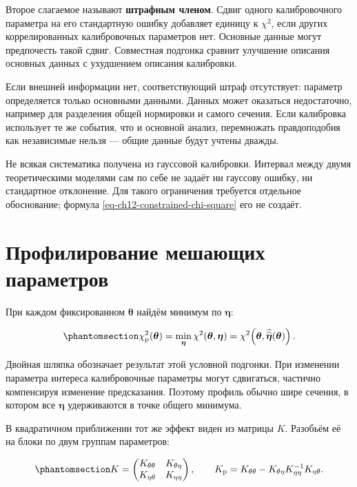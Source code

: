 \documentclass[
  russian,
  11pt,
  a4paper,
  open=any]{scrbook}
\begin{document}
Второе слагаемое называют \textbf{штрафным членом}. Сдвиг одного
калибровочного параметра на его стандартную ошибку добавляет единицу к
\(\chi^2\), если других коррелированных калибровочных параметров нет.
Основные данные могут предпочесть такой сдвиг. Совместная подгонка
сравнит улучшение описания основных данных с ухудшением описания
калибровки.

Если внешней информации нет, соответствующий штраф отсутствует: параметр
определяется только основными данными. Данных может оказаться
недостаточно, например для разделения общей нормировки и самого сечения.
Если калибровка использует те же события, что и основной анализ,
перемножать правдоподобия как независимые нельзя --- общие данные будут
учтены дважды.

Не всякая систематика получена из гауссовой калибровки. Интервал между
двумя теоретическими моделями сам по себе не задаёт ни гауссову ошибку,
ни стандартное отклонение. Для такого ограничения требуется отдельное
обоснование; формула \ref{eq-ch12-constrained-chi-square} его не
создаёт.

\section{Профилирование мешающих
параметров}\label{ux43fux440ux43eux444ux438ux43bux438ux440ux43eux432ux430ux43dux438ux435-ux43cux435ux448ux430ux44eux449ux438ux445-ux43fux430ux440ux430ux43cux435ux442ux440ux43eux432}

При каждом фиксированном \(\boldsymbol\theta\) найдём минимум по
\(\boldsymbol\eta\):

\begin{equation}\protect\phantomsection\label{eq-ch12-profile-definition}{
\chi^2_{\mathrm p}(\boldsymbol\theta)
=\min_{\boldsymbol\eta}\chi^2(\boldsymbol\theta,\boldsymbol\eta)
=\chi^2\!\left(\boldsymbol\theta,
\widehat{\widehat{\boldsymbol\eta}}(\boldsymbol\theta)\right).
}\end{equation}

Двойная шляпка обозначает результат этой условной подгонки. При
изменении параметра интереса калибровочные параметры могут сдвигаться,
частично компенсируя изменение предсказания. Поэтому профиль обычно шире
сечения, в котором все \(\boldsymbol\eta\) удерживаются в точке общего
минимума.

В квадратичном приближении тот же эффект виден из матрицы \(K\).
Разобьём её на блоки по двум группам параметров:

\begin{equation}\protect\phantomsection\label{eq-ch12-profile-curvature}{
K=\begin{pmatrix}
K_{\theta\theta}&K_{\theta\eta}\\
K_{\eta\theta}&K_{\eta\eta}
\end{pmatrix},
\qquad
K_{\mathrm p}=K_{\theta\theta}
-K_{\theta\eta}K_{\eta\eta}^{-1}K_{\eta\theta}.
}\end{equation}
\end{document}
